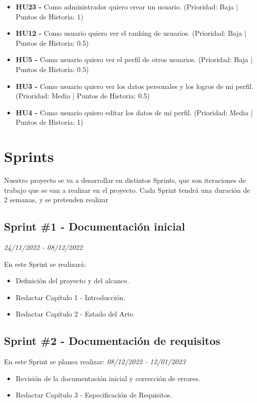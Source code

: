\begin{itemize}
    \item \textbf{HU23 - } Como administrador quiero crear un usuario. (Prioridad: Baja | Puntos de Historia: 1)
    \item \textbf{HU12 - } Como usuario quiero ver el ranking de usuarios. (Prioridad: Baja | Puntos de Historia: 0.5)
    \item \textbf{HU5 - } Como usuario quiero ver el perfil de otros usuarios.  (Prioridad: Baja | Puntos de Historia: 0.5)
    \item \textbf{HU3 - } Como usuario quiero ver los datos personales y los logros de mi perfil. (Prioridad: Media | Puntos de Historia: 0.5)
    \item \textbf{HU4 - } Como usuario quiero editar los datos de mi perfil. (Prioridad: Media | Puntos de Historia: 1)
\end{itemize}

\section{Sprints}
Nuestro proyecto se va a desarrollar en distintos Sprints, que son iteraciones de trabajo que se van a realizar en el proyecto.
Cada Sprint tendrá una duración de 2 semanas, y se pretenden realizar
\subsection{Sprint \#1 - Documentación inicial}
\textit{24/11/2022   -   08/12/2022}

En este Sprint se realizará:
\begin{itemize}

    \item Definición del proyecto y del alcance.
    \item Redactar Capítulo 1 - Introducción.
    \item Redactar Capítulo 2 - Estado del Arte.
\end{itemize}
\subsection{Sprint \#2 - Documentación de requisitos}
En este Sprint se planea realizar:
\textit{08/12/2022   -   12/01/2023}
\begin{itemize}
    \item Revisión de la documentación inicial y corrección de errores.
    \item Redactar Capítulo 3 - Especificación de Requisitos.
\end{itemize}

